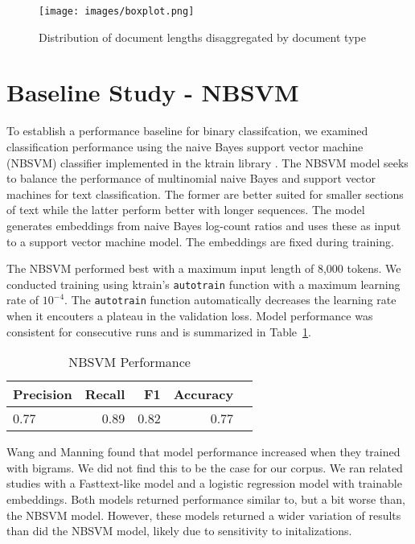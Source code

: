 \documentclass[twocolumn,10pt]{wmrDoc}
\begin{document}
\begin{figure}[h]
    \centering
    \texttt{[image: images/boxplot.png]}
    \caption{Distribution of document lengths disaggregated by document type}
    \label{fig:boxplot}
\end{figure}

\section{Baseline Study - NBSVM}
To establish a performance baseline for binary classifcation, we examined classification performance using the naive Bayes support vector machine (NBSVM) classifier implemented in the ktrain library \cite{ktrain}.  The NBSVM model \cite{wang2012} seeks to balance the performance of multinomial naive Bayes and support vector machines for text classification.  The former are better suited for smaller sections of text while the latter perform better with longer sequences.  The model generates embeddings from naive Bayes log-count ratios and uses these as input to a support vector machine model.  The embeddings are fixed during training.

The NBSVM performed best with a maximum input length of 8,000 tokens.  We conducted training using ktrain's \verb|autotrain| function with a maximum learning rate of $10^{-4}$.  The \verb|autotrain| function automatically decreases the learning rate when it encouters a plateau in the validation loss.  Model performance was consistent for consecutive runs and is summarized in Table~\ref{tab:baseline}.

\begin{table}
 \caption{NBSVM Performance}
  \centering
  \begin{tabular}{lrrrr}
    \toprule
    Precision & Recall & F1 & Accuracy\\
    \midrule
    0.77 & 0.89 & 0.82 & 0.77 \\
    \bottomrule
  \end{tabular}
  \label{tab:baseline}
\end{table}

Wang and Manning found that model performance increased when they trained with bigrams.  We did not find this to be the case for our corpus.  We ran related studies with a Fasttext-like model and a logistic regression model with trainable embeddings.  Both models returned performance similar to, but a bit worse than, the NBSVM model.  However, these models returned a wider variation of results than did the NBSVM model, likely due to sensitivity to initalizations.
\end{document}
